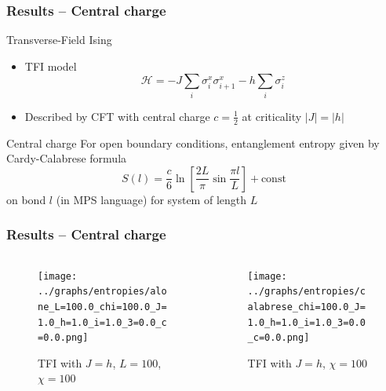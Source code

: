 \documentclass[10pt]{beamer}
\begin{document}
\begin{frame}
    \frametitle{Results -- Central charge}

    \begin{block}{Transverse-Field Ising}
        \begin{itemize}
            \item TFI model $$\mathcal{H} = -J\sum_i \sigma^x_i \sigma^x_{i+1} - h\sum_i \sigma^z_i$$
            \pause
            \item Described by CFT with central charge $c= \frac{1}{2}$ at criticality $|J| = |h|$
        \end{itemize}
    \end{block}

    \pause
    \begin{block}{Central charge}
        For open boundary conditions, entanglement entropy given by Cardy-Calabrese formula $$S(l) = \frac{c}{6} \ln\left[\frac{2L}{\pi} \sin \frac{\pi l}{L} \right] + \text{const}$$ on bond $l$ (in MPS language) for system of length $L$
    \end{block}
\end{frame}

\begin{frame}
    \frametitle{Results -- Central charge}

    \begin{columns}
        \begin{column}{0.57\linewidth}
            \begin{figure}
                \texttt{[image: ../graphs/entropies/alone\_L=100.0\_chi=100.0\_J=1.0\_h=1.0\_i=1.0\_3=0.0\_c=0.0.png]}
                \caption{TFI with $J=h$, $L=100$, $\chi=100$}
            \end{figure}
        \end{column}

        \begin{column}{0.6\linewidth}
            \vspace{0.45cm}
            \pause
            \begin{figure}
                \texttt{[image: ../graphs/entropies/calabrese\_chi=100.0\_J=1.0\_h=1.0\_i=1.0\_3=0.0\_c=0.0.png]}
                \caption{TFI with $J=h$, $\chi=100$}
            \end{figure}
        \end{column}        
    \end{columns}
\end{frame}
\end{document}
